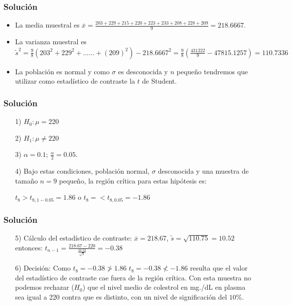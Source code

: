 \begin{frame}
\frametitle{Solución}
\begin{itemize}
\item La media muestral es   
$\overline{x}=\frac{203+ 229+ 215+ 220+ 223+ 233+ 208+ 228+
        209}{9}=218.6667$.
\item La varianza muestral es  $\tilde{s}^2= \frac{9}{8}\left(203^2+229^2+\ldots\right. \left. \ldots + (209)^2\right)-218.6667^2=\frac{9}{8}\left(\frac{431222}{9}-47815.1257\right)=110.7336$


\item  La población es normal y como $\sigma$ es desconocida y $n$ pequeño
 tendremos que utilizar como estadístico de contraste la $t$ de
 Student.
\end{itemize}
\end{frame}

\begin{frame}
\frametitle{Solución}
\begin{itemize}
 \item[1)] $H_{0}:\mu=220$
 \item[2)] $H_{1}:\mu\not=220$
 \item[3)] $\alpha=0.1$; $\frac{\alpha}{2}=0.05$.  
\item[4)] Bajo estas condiciones, población normal, $\sigma$ desconocida
 y una muestra de tamaño  $n=9$ pequeño, la región crítica para estas
 hipótesis es:


    $t_{8}>t_{8,1-0.05}=1.86$ o $t_{8}=<t_{8,0.05}=-1.86$
\end{itemize}
\end{frame}
\begin{frame}
\frametitle{Solución}
\begin{itemize}
\item[5)] Cálculo del estadístico de contraste:
 $\overline{x}=218.67$, $\tilde{s}=\sqrt{110.75}=10.52$  entonces:
 $t_{n-1}=\frac{218.67-220}{\frac{10.52}{\sqrt{9}}}=-0.38$
\item[6)] Decisión: Como $t_{8}=-0.38\not>1.86$  $t_{8}=-0.38\not<-1.86$
resulta que el valor del estadístico de contraste cae fuera de la región crítica. 
Con esta muestra no podemos rechazar ($H_{0}$) que el nivel medio de colestrol en mg./dL  en plasma sea igual a 220 contra que es distinto, con un nivel de significación del $10\%$.
\end{itemize}
\end{frame}

